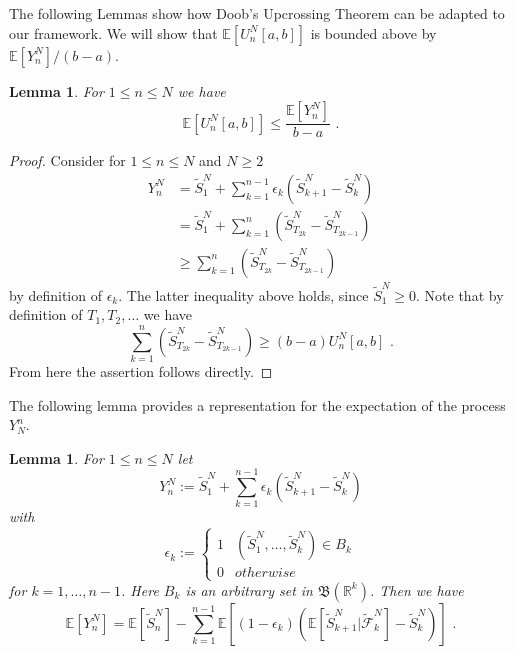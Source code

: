 \documentclass[phd]{UWMThesis}
\newcommand{\E}{\mathbb{E}}
\newcommand{\F}{\mathcal{F}}
\newcommand{\StN}[1]{\tilde{S}_{#1}^N}
\newcommand{\FtN}[1]{\tilde{\F}_{#1}^N}
\newcommand{\YN}[1]{Y_{#1}^N}
\newcommand{\UNab}[1]{U_{#1}^N[a,b]}
\newcommand{\mdot}{\textrm{ .}}
\renewcommand{\.}{\textrm{ .}}
\newtheorem{lemma}[thm]{Lemma}
\theoremstyle{definition}
\numberwithin{thm}{chapter}
\begin{document}
%
%
%
The following Lemmas show how Doob's Upcrossing Theorem can be adapted to our framework. We will show that $\E[\UNab{n}]$ is bounded above by $\E[Y_n^N]/(b-a)$.
\begin{lemma}
	For $1\leq n\leq N$ we have
	$$\E[\UNab{n}]\leq \frac{\E[\YN{n}]}{b-a}\mdot$$
	\label{lem:upcrossings_yn}
\end{lemma}
%
\begin{proof}
	Consider for $1\leq n\leq N$ and $N\geq 2$
	\begin{align*}
	Y_n^N &= \StN{1} + \sum_{k=1}^{n-1}\epsilon_k(\StN{k+1}-\StN{k})\\
	&= \StN{1} + \sum_{k=1}^{n}(\StN{T_{2k}}-\StN{T_{2k-1}})\\
	&\geq \sum_{k=1}^{n}(\StN{T_{2k}}-\StN{T_{2k-1}})
	\end{align*}
	by definition of $\epsilon_k$. The latter inequality above holds, since $\StN{1}\geq 0$. Note that by definition of $T_1, T_2, \dots$ we have
	$$\sum_{k=1}^{n}(\StN{T_{2k}}-\StN{T_{2k-1}}) \geq (b-a)\UNab{n}\mdot$$
	From here the assertion follows directly.
\end{proof}
%
The following lemma provides a representation for the expectation of the process $Y_N^n$.
\begin{lemma}
	\label{lem:optional_skipping}
	For $1\leq n\leq N$ let
	$$\YN{n} := \StN{1} + \sum_{k=1}^{n-1} \epsilon_k (\StN{k+1} - \StN{k}) $$
	with
	\[ \epsilon_k := \begin{cases} 
	1 & (\StN{1},\dots,\StN{k})\in B_k \\
	0 & otherwise 
	\end{cases}
	\]
	for $k=1,\dots, n-1$. Here $B_k$ is an arbitrary set in $\mathfrak{B}(\mathbb{R}^k)$. Then we have
	\begin{equation}
	\E[\YN{n}] = \E[\StN{n}] - \sum_{k=1}^{n-1}\E\left[(1-\epsilon_k)\left(\E[\StN{k+1}|\FtN{k}]  - \StN{k} \right)\right]\mdot
	\label{eq:ineq_yk}
	\end{equation}
\end{lemma}
%
\end{document}
